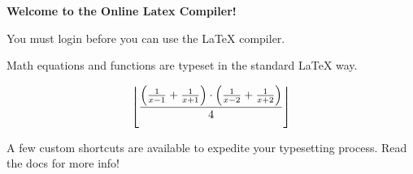 \documentclass{article}
\begin{document}
\vspace{10cm}

\begin{center}
    \textbf{Welcome to the Online Latex Compiler!}
\end{center}

You must login before you can use the LaTeX compiler.

Math equations and functions are typeset in the standard LaTeX way.

$$\left\lfloor \frac{\left(\frac{1}{x-1} + \frac{1}{x+1}\right)\cdot\left(\frac{1}{x-2} + \frac{1}{x+2}\right)}{4}\right\rfloor$$

A few custom shortcuts are available to expedite your typesetting process. Read the docs for more info!
\end{document}
